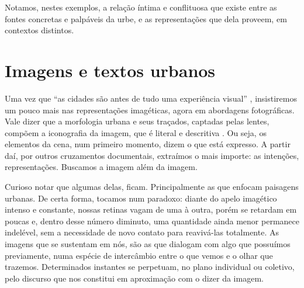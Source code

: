 \begin{refsection}
    Notamos, nestes exemplos, a relação íntima e conflituosa que existe entre as fontes concretas e palpáveis da urbe, e as representações que dela proveem, em contextos distintos.

    \section{Imagens e textos urbanos}

    Uma vez que ``as cidades são antes de tudo uma experiência visual'' \cite[p.~237]{Bresciani2014Historia}, insistiremos um pouco mais nas representações imagéticas, agora em abordagens fotográficas. Vale dizer que a morfologia urbana e seus traçados, captadas pelas lentes, compõem a iconografia da imagem, que é literal e descritiva \cite{Kossoy2014Fotografia}. Ou seja, os elementos da cena, num primeiro momento, dizem o que está expresso. A partir daí, por outros cruzamentos documentais, extraímos o mais importe: as intenções, representações. Buscamos a imagem além da imagem.  

    Curioso notar que algumas delas, ficam. Principalmente as que enfocam paisagens urbanas. De certa forma, tocamos num paradoxo: diante do apelo imagético intenso e constante, nossas retinas vagam de uma à outra, porém se retardam em poucas e, dentro desse número diminuto, uma quantidade ainda menor permanece indelével, sem a necessidade de novo contato para reavivá-las totalmente. As imagens que se sustentam em nós, são as que dialogam com algo que possuímos previamente, numa espécie de intercâmbio entre o que vemos e o olhar que trazemos. Determinados instantes se perpetuam, no plano individual ou coletivo, pelo discurso que nos constitui em aproximação com o dizer da imagem. 


\end{refsection}

